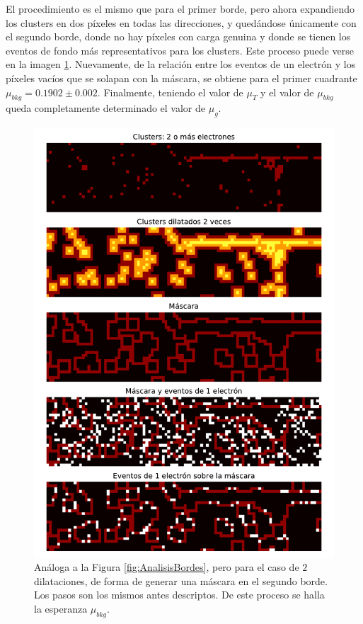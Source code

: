 El procedimiento es el mismo que para el primer borde, pero ahora expandiendo los clusters en dos píxeles en todas las direcciones, y quedándose únicamente con el segundo borde, donde no hay píxeles con carga genuina y donde se tienen los eventos de fondo más representativos para los clusters. Este proceso puede verse en la imagen \ref{fig:AnalisisBordesx2}. Nuevamente, de la relación entre los eventos de un electrón y los píxeles vacíos que se solapan con la máscara, se obtiene para el primer cuadrante $\mu_{bkg} = 0.1902 \pm 0.002$. Finalmente, teniendo el valor de $\mu_{T}$ y el valor de $\mu_{bkg}$ queda completamente determinado el valor de $\mu_{g}$.
\begin{figure}[H]
    \centering
    \includegraphics[scale=0.65]{Figs/analisis_bordesx2.pdf}
    \caption{Análoga a la Figura \ref{fig:AnalisisBordes}, pero para el caso de $2$ dilataciones, de forma de generar una máscara en el segundo borde. Los pasos son los mismos antes descriptos. De este proceso se halla la esperanza $\mu_{bkg}$.}
    \label{fig:AnalisisBordesx2}
\end{figure}
